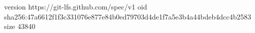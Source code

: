 version https://git-lfs.github.com/spec/v1
oid sha256:47a6612f1f3c331076e877e84b0ed79703d4de1f7a5e3b4a44bdeb4dcc4b2583
size 43840
